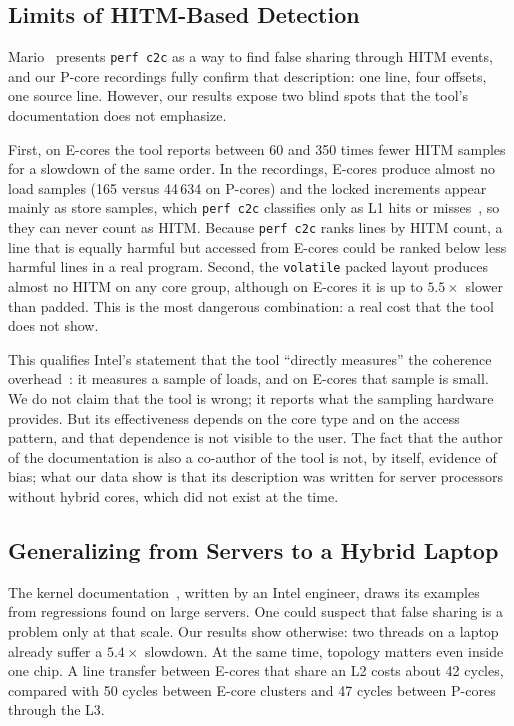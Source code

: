 \documentclass[journal]{IEEEtran}
\begin{document}
\subsection{Limits of HITM-Based Detection}
Mario~\cite{mario2016c2c} presents \texttt{perf c2c} as a way to find false
sharing through HITM events, and our P-core recordings fully confirm that
description: one line, four offsets, one source line. However, our results
expose two blind spots that the tool's documentation does not emphasize.

First, on E-cores the tool reports between 60 and 350 times fewer HITM samples
for a slowdown of the same order. In the recordings, E-cores produce almost no
load samples (165 versus 44\,634 on P-cores) and the locked increments appear
mainly as store samples, which \texttt{perf c2c} classifies only as L1 hits or
misses~\cite{perf_c2c_man}, so they can never count as HITM. Because
\texttt{perf c2c} ranks lines by HITM count, a line that is equally harmful but
accessed from E-cores could be ranked below less harmful lines in a real
program. Second, the \texttt{volatile} packed layout produces almost no HITM on
any core group, although on E-cores it is up to $5.5\times$ slower than padded.
This is the most dangerous combination: a real cost that the tool does not
show.

This qualifies Intel's statement that the tool ``directly measures'' the
coherence overhead~\cite{intel2024opt}: it measures a sample of loads, and on
E-cores that sample is small. We do not claim that the tool is wrong; it
reports what the sampling hardware provides. But its effectiveness depends on the core type and on the access
pattern, and that dependence is not visible to the user. The fact that the
author of the documentation is also a co-author of the tool is not, by itself,
evidence of bias; what our data show is that its description was written for
server processors without hybrid cores, which did not exist at the time.

\subsection{Generalizing from Servers to a Hybrid Laptop}
The kernel documentation~\cite{tang2023kernel}, written by an Intel engineer,
draws its examples from regressions found on large servers. One could suspect
that false sharing is a problem only at that scale. Our results show otherwise:
two threads on a laptop already suffer a $5.4\times$ slowdown. At the same time,
topology matters even inside one chip. A line transfer between E-cores that
share an L2 costs about 42 cycles, compared with 50 cycles between E-core
clusters and 47 cycles between P-cores through the L3.
\end{document}
